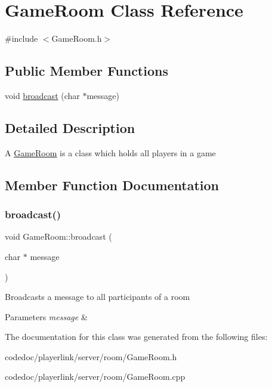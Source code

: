 \hypertarget{classGameRoom}{}\section{Game\+Room Class Reference}
\label{classGameRoom}


{\ttfamily \#include $<$Game\+Room.\+h$>$}

\subsection*{Public Member Functions}
\begin{DoxyCompactItemize}
\item 
void \hyperlink{classGameRoom_a6366096d3e301a679b95c45c7d128158}{broadcast} (char $\ast$message)
\end{DoxyCompactItemize}


\subsection{Detailed Description}
A \hyperlink{classGameRoom}{Game\+Room} is a class which holds all players in a game 

\subsection{Member Function Documentation}
\mbox{\label{classGameRoom_a6366096d3e301a679b95c45c7d128158}} 
\subsubsection{\texorpdfstring{broadcast()}{broadcast()}}
{\footnotesize\ttfamily void Game\+Room\+::broadcast (\begin{DoxyParamCaption}\item[{char $\ast$}]{message }\end{DoxyParamCaption})}

Broadcasts a message to all participants of a room 
\begin{DoxyParams}{Parameters}
{\em message} & \\
\hline
\end{DoxyParams}


The documentation for this class was generated from the following files\+:\begin{DoxyCompactItemize}
\item 
codedoc/playerlink/server/room/Game\+Room.\+h\item 
codedoc/playerlink/server/room/Game\+Room.\+cpp\end{DoxyCompactItemize}

